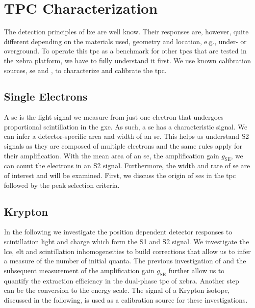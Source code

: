 \FloatBarrier
\chapter{TPC Characterization}
\label{chap:Analysis}
\FloatBarrier

The detection principles of \gls{lxe}  are well know.
Their responses are, however, quite different depending on the materials used, geometry and location, e.g., under- or overground.
To operate this \gls{tpc} as a benchmark for other \glspl{tpc} that are tested in the \gls{xebra} platform, we have to fully understand it first.
We use known calibration sources, \gls{se} and , to characterize and calibrate the \gls{tpc}.

\FloatBarrier
\section{Single Electrons}
\label{sec:SE}
\FloatBarrier

A \gls{se} is the light signal we measure from just one electron that undergoes proportional scintillation in the \gls{gxe}.
As such, a \gls{se} has a characteristic signal.
We can infer a detector-specific area and width of an \gls{se}.
This helps us understand S2 signals as they are composed of multiple electrons and the same rules apply for their amplification.
With the mean area of an \gls{se}, the amplification gain $ g_\mathrm{SE} $, we can count the electrons in an S2 signal.
Furthermore, the width and rate of \gls{se} are of interest and will be examined.
First, we discuss the origin of \glspl{se} in the \gls{tpc} followed by the peak selection criteria.



\newpage

\newpage

\newpage

\newpage

\newpage

\FloatBarrier
\section{Krypton}
\label{sec:Kr}
\FloatBarrier


In the following we investigate the position dependent detector responses to scintillation light and charge which form the S1 and S2 signal.
We investigate the \gls{lce}, \gls{elt} and scintillation inhomogeneities to build corrections that allow us to infer a measure of the number of initial quanta.
The previous investigation of  and the subsequent measurement of the amplification gain $ g_\mathrm{SE} $ further allow us to quantify the extraction efficiency in the dual-phase \gls{tpc} of \gls{xebra}.
Another step can be the conversion to the energy scale.
The signal of a Krypton isotope, discussed in the following, is used as a calibration source for these investigations.


